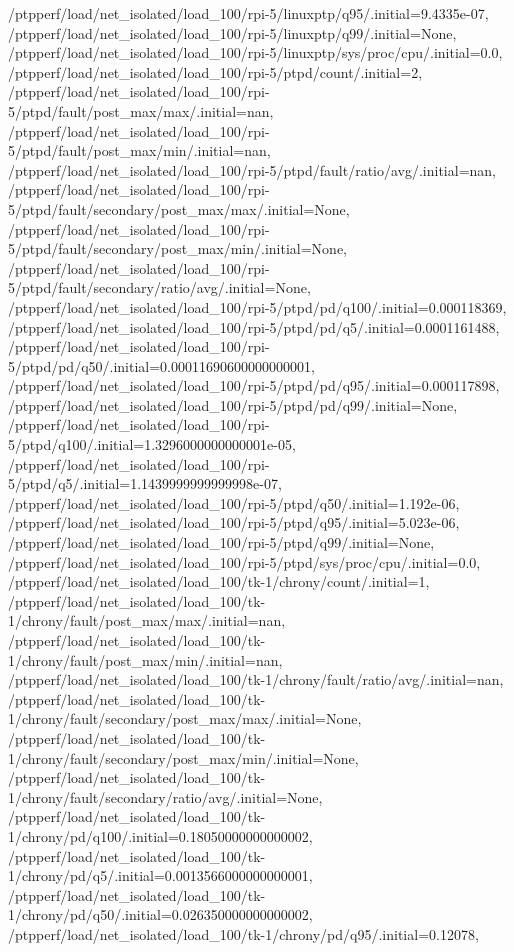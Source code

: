 {    /ptpperf/load/net_isolated/load_100/rpi-5/linuxptp/q95/.initial=9.4335e-07,
    /ptpperf/load/net_isolated/load_100/rpi-5/linuxptp/q99/.initial=None,
    /ptpperf/load/net_isolated/load_100/rpi-5/linuxptp/sys/proc/cpu/.initial=0.0,
    /ptpperf/load/net_isolated/load_100/rpi-5/ptpd/count/.initial=2,
    /ptpperf/load/net_isolated/load_100/rpi-5/ptpd/fault/post_max/max/.initial=nan,
    /ptpperf/load/net_isolated/load_100/rpi-5/ptpd/fault/post_max/min/.initial=nan,
    /ptpperf/load/net_isolated/load_100/rpi-5/ptpd/fault/ratio/avg/.initial=nan,
    /ptpperf/load/net_isolated/load_100/rpi-5/ptpd/fault/secondary/post_max/max/.initial=None,
    /ptpperf/load/net_isolated/load_100/rpi-5/ptpd/fault/secondary/post_max/min/.initial=None,
    /ptpperf/load/net_isolated/load_100/rpi-5/ptpd/fault/secondary/ratio/avg/.initial=None,
    /ptpperf/load/net_isolated/load_100/rpi-5/ptpd/pd/q100/.initial=0.000118369,
    /ptpperf/load/net_isolated/load_100/rpi-5/ptpd/pd/q5/.initial=0.0001161488,
    /ptpperf/load/net_isolated/load_100/rpi-5/ptpd/pd/q50/.initial=0.00011690600000000001,
    /ptpperf/load/net_isolated/load_100/rpi-5/ptpd/pd/q95/.initial=0.000117898,
    /ptpperf/load/net_isolated/load_100/rpi-5/ptpd/pd/q99/.initial=None,
    /ptpperf/load/net_isolated/load_100/rpi-5/ptpd/q100/.initial=1.3296000000000001e-05,
    /ptpperf/load/net_isolated/load_100/rpi-5/ptpd/q5/.initial=1.1439999999999998e-07,
    /ptpperf/load/net_isolated/load_100/rpi-5/ptpd/q50/.initial=1.192e-06,
    /ptpperf/load/net_isolated/load_100/rpi-5/ptpd/q95/.initial=5.023e-06,
    /ptpperf/load/net_isolated/load_100/rpi-5/ptpd/q99/.initial=None,
    /ptpperf/load/net_isolated/load_100/rpi-5/ptpd/sys/proc/cpu/.initial=0.0,
    /ptpperf/load/net_isolated/load_100/tk-1/chrony/count/.initial=1,
    /ptpperf/load/net_isolated/load_100/tk-1/chrony/fault/post_max/max/.initial=nan,
    /ptpperf/load/net_isolated/load_100/tk-1/chrony/fault/post_max/min/.initial=nan,
    /ptpperf/load/net_isolated/load_100/tk-1/chrony/fault/ratio/avg/.initial=nan,
    /ptpperf/load/net_isolated/load_100/tk-1/chrony/fault/secondary/post_max/max/.initial=None,
    /ptpperf/load/net_isolated/load_100/tk-1/chrony/fault/secondary/post_max/min/.initial=None,
    /ptpperf/load/net_isolated/load_100/tk-1/chrony/fault/secondary/ratio/avg/.initial=None,
    /ptpperf/load/net_isolated/load_100/tk-1/chrony/pd/q100/.initial=0.18050000000000002,
    /ptpperf/load/net_isolated/load_100/tk-1/chrony/pd/q5/.initial=0.0013566000000000001,
    /ptpperf/load/net_isolated/load_100/tk-1/chrony/pd/q50/.initial=0.026350000000000002,
    /ptpperf/load/net_isolated/load_100/tk-1/chrony/pd/q95/.initial=0.12078,
}
